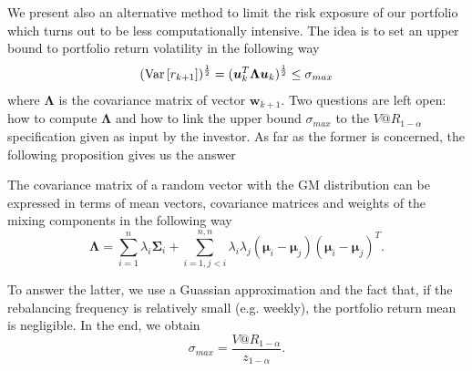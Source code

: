 We present also an alternative method to limit the risk exposure of our portfolio which turns out to be less computationally intensive. The idea is to set an upper bound to portfolio return volatility in the following way 
\begin{equation}\label{eq:risk_upperbnd}
(\operatorname{Var}\left[r_{k+1}\right])^{\frac{1}{2}} = (\bm{u}_k^T \bm{\Lambda} \bm{u}_k)^{\frac{1}{2}} \leq \sigma_{max}
\end{equation}
where $\bm{\Lambda}$ is the covariance matrix of vector $\bm{w}_{k+1}$. Two questions are left open: how to compute $\bm{\Lambda}$ and how to link the upper bound $\sigma_{max}$ to the $V@R_{1-\alpha}$ specification given as input by the investor. As far as the former is concerned, the following proposition gives us the answer \cite{BUCKLEY2008}
\begin{proposition}
	The covariance matrix of a random vector with the GM distribution can be expressed in terms of mean vectors, covariance matrices and weights of the mixing components in the following way
	\[ \bm{\Lambda} = \sum_{i=1}^{n}\lambda_i\bm{\Sigma}_i + \sum_{i=1,j<i}^{n,n} \lambda_i\lambda_j(\bm{\mu}_i-\bm{\mu}_j)(\bm{\mu}_i-\bm{\mu}_j)^T.\]
\end{proposition}
To answer the latter, we use a Guassian approximation and the fact that, if the rebalancing frequency is relatively small (e.g. weekly), the portfolio return mean is negligible. In the end, we obtain
\[ \sigma_{max} = \frac{V@R_{1-\alpha}}{z_{1-\alpha}}. \] 
